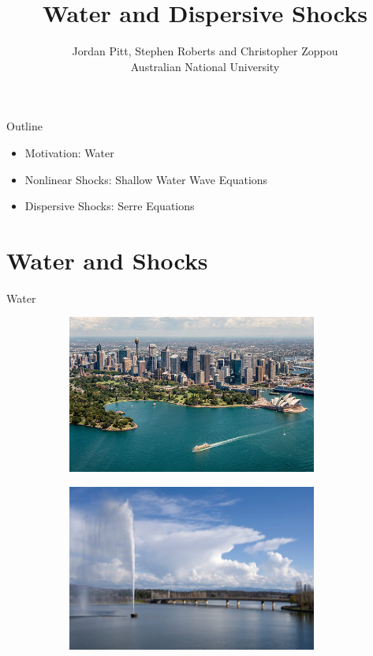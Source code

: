 \documentclass[handout]{beamer}
\title{Water and Dispersive Shocks}
\author{Jordan Pitt, Stephen Roberts and Christopher Zoppou \\ Australian National University}
\begin{document}
\begin{frame}
\titlepage
\end{frame}
\begin{frame}{Outline}
	\begin{itemize}
		\item Motivation: Water \pause
		\item Nonlinear Shocks: Shallow Water Wave Equations \pause
		\item Dispersive Shocks: Serre Equations
	\end{itemize}
\end{frame}
\section{Water and Shocks}
\begin{frame}{Water}
\begin{figure}
	\centering
	\begin{subfigure}{0.5\textwidth}
		\includegraphics[width=0.9\textwidth]{./Figures/SydneyHarbour.jpg}
		\vspace{0.5cm}
	\end{subfigure}%
	\pause
	\begin{subfigure}{0.475\textwidth}
		\includegraphics[width=0.9\textwidth]{./Figures/LakeBG.jpg}
		\vspace{0.5cm}
	\end{subfigure}
		\end{figure}
\end{frame}
\end{document}
